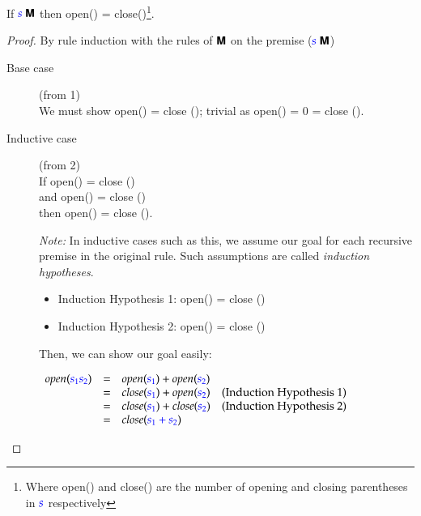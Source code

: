 \documentclass{book}
\begin{document}
\begin{theorem} 
  If ${\textcolor{blue}{s}}\;\textsf{\textbf{M}}$ then \<open() = close()\>\footnote{Where
    \<open()\> and \<close()\> are the number of opening and 
    closing parentheses in $\textcolor{blue}{s}$ respectively}.
  \begin{proof}  By rule induction with the rules of $\textsf{\textbf{M}}$ on the premise (${\textcolor{blue}{s}}\;\textsf{\textbf{M}}$)
\begin{description}
\item[Base case] (from 1) \\ We must show \<open(\conc{\epsilon}) = close
  (\conc{\epsilon})\>; trivial as \<open(\conc{\epsilon}) = 0 = close (\conc{\epsilon})\>.

\item[Inductive case] (from 2) \\ If \<open() = close ()\> \\
                      and \<open() = close ()\> \\
                      then \<open() = close ()\>.

  \emph{Note:} In inductive cases such as this, we assume our goal for each recursive premise
  in the original rule. Such assumptions are called \emph{induction hypotheses}. 

  \begin{itemize}
    \item Induction Hypothesis 1:  \<open() = close ()\>

    \item Induction Hypothesis 2:   \<open() = close ()\>
  \end{itemize}
  
  Then, we can show our goal easily:

    $\begin{array}{lclr}
    \mathit{open}(\textcolor{blue}{s_1 s_2}) & = & \mathit{open}(\textcolor{blue}{s_1}) + \mathit{open} (\textcolor{blue}{s_2}) & \\ 
                                  & = & \mathit{close}(\textcolor{blue}{s_1}) + \mathit{open} (\textcolor{blue}{s_2}) & \text{(Induction Hypothesis 1)}\\
                                  & = & \mathit{close}(\textcolor{blue}{s_1}) + \mathit{close} (\textcolor{blue}{s_2}) & \text{(Induction Hypothesis 2)}\\
                                  & = & \mathit{close} (\textcolor{blue}{s_1 + s_2})\> \end{array}$
  

\end{description}
\end{proof}
\end{theorem}
\end{document}
